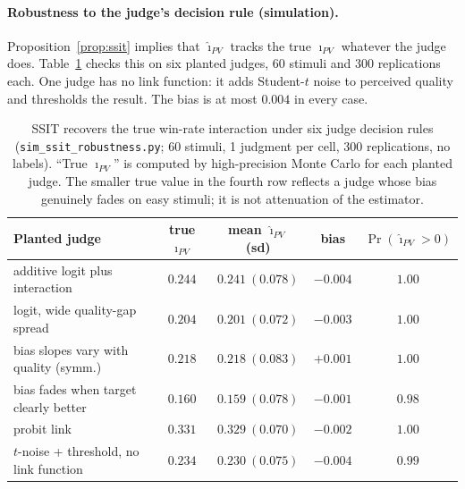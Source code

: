\documentclass[10pt]{article}
\theoremstyle{remark}
\newcommand{\iPV}{\imath_{PV}}
\newcommand{\hiPV}{\hat\imath_{PV}}
\begin{document}
\paragraph{Robustness to the judge's decision rule (simulation).}
Proposition~\ref{prop:ssit} implies that $\hiPV$ tracks the true
$\iPV$ whatever the judge does. Table~\ref{tab:robust} checks this on
six planted judges, $60$ stimuli and $300$ replications each. One
judge has no link function: it adds Student-$t$ noise to perceived
quality and thresholds the result. The bias is at most $0.004$ in every
case.

\begin{table}[t]
\centering
\caption{SSIT recovers the true win-rate interaction under six judge
decision rules (\texttt{sim\_ssit\_robustness.py}; 60 stimuli, 1
judgment per cell, 300 replications, no labels). ``True $\iPV$'' is
computed by high-precision Monte Carlo for each planted judge. The
smaller true value in the fourth row reflects a judge whose bias genuinely
fades on easy stimuli; it is not attenuation of the estimator.}
\label{tab:robust}
\small
\begin{tabular}{lcccc}
\toprule
Planted judge & true $\iPV$ & mean $\hiPV$ (sd) & bias & $\Pr(\hiPV>0)$\\
\midrule
additive logit plus interaction          & $0.244$ & $0.241\ (0.078)$ & $-0.004$ & $1.00$\\
logit, wide quality-gap spread           & $0.204$ & $0.201\ (0.072)$ & $-0.003$ & $1.00$\\
bias slopes vary with quality (symm.)    & $0.218$ & $0.218\ (0.083)$ & $+0.001$ & $1.00$\\
bias fades when target clearly better    & $0.160$ & $0.159\ (0.078)$ & $-0.001$ & $0.98$\\
probit link                              & $0.331$ & $0.329\ (0.070)$ & $-0.002$ & $1.00$\\
$t$-noise + threshold, no link function  & $0.234$ & $0.230\ (0.075)$ & $-0.004$ & $0.99$\\
\bottomrule
\end{tabular}
\end{table}
\end{document}
